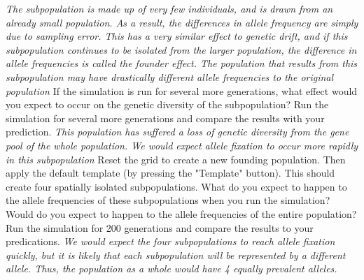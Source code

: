\documentclass[12pt]{article}
\begin{document}
\begin{spacing}{1.5}
\newline
\textit{The subpopulation is made up of very few individuals, and is drawn from an already small population. As a result, the differences in allele frequency are simply due to sampling error. This has a very similar effect to genetic drift, and if this subpopulation continues to be isolated from the larger population, the difference in allele frequencies is called the founder effect. The population that results from this subpopulation may have drastically different allele frequencies to the original population}\newline
\newline
If the simulation is run for several more generations, what effect would you expect to occur on the genetic diversity of the subpopulation? Run the simulation for several more generations and compare the results with your prediction.\newline
\newline
\textit{This population has suffered a loss of genetic diversity from the gene pool of the whole population. We would expect allele fixation to occur more rapidly in this subpopulation}\newline
\newline
Reset the grid to create a new founding population. Then apply the default template (by pressing the "Template" button). This should create four spatially isolated subpopulations. What do you expect to happen to the allele frequencies of these subpopulations when you run the simulation? Would do you expect to happen to the allele frequencies of the entire population? Run the simulation for 200 generations and compare the results to your predications.\newline
\newline
\textit{We would expect the four subpopulations to reach allele fixation quickly, but it is likely that each subpopulation will be represented by a different allele. Thus, the population as a whole would have 4 equally prevalent alleles.}


\end{spacing}
\end{document}
